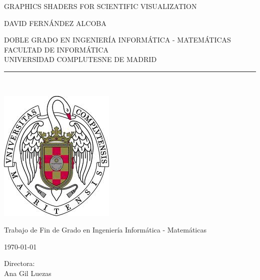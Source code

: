 
\newpage


\thispagestyle{empty}

\begin{center}

   \vspace{1cm}

   {\Large GRAPHICS SHADERS FOR SCIENTIFIC VISUALIZATION}\\

   \vspace{0.5cm}

   \vspace{0.5cm}

   {\large DAVID FERNÁNDEZ ALCOBA}\\

   \vspace{0.5cm}

   DOBLE GRADO EN INGENIERÍA INFORMÁTICA - MATEMÁTICAS\\ 
   FACULTAD DE INFORMÁTICA\\
   UNIVERSIDAD COMPLUTESNE DE MADRID \\

   \vspace{0.65cm}
   \rule{2in}{0.5pt}\\
   \vspace{1.85cm}

  \includegraphics[height=2.5in]{figures/escudo.jpg}
  
   \vspace{1.5cm}
Trabajo de Fin de Grado en Ingeniería Informática - Matemáticas

   \vspace{0.5cm}

  \today\\
   \vspace{1cm}

\end{center}

{\raggedleft
   \vspace{ 1cm}
Directora:\\
   \vspace{ 0.2cm}
Ana Gil Luezas\\
}
